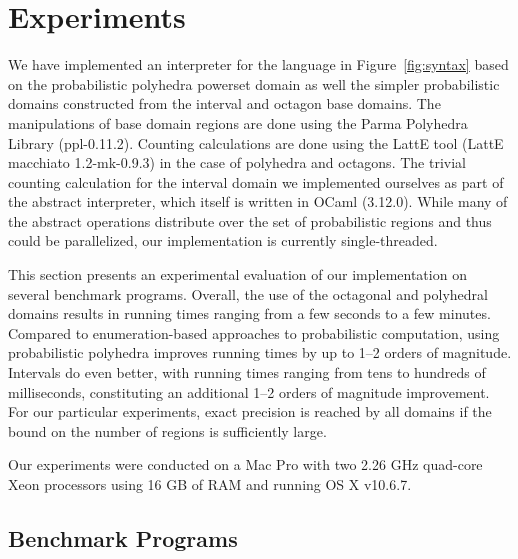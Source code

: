 \section{Experiments} \label{sec:impl}

We have implemented an interpreter for the language in
Figure~\ref{fig:syntax} based on the probabilistic polyhedra powerset
domain as well the simpler probabilistic domains constructed from the
interval and octagon base domains. The manipulations of base domain
regions are done using the Parma Polyhedra Library
\cite{parma} (ppl-0.11.2). Counting calculations are done using the LattE
\cite{latte} tool (LattE macchiato 1.2-mk-0.9.3) in the case of
polyhedra and octagons. The trivial counting
calculation for the interval domain we implemented ourselves as part
of the abstract interpreter, which itself is written in OCaml (3.12.0).  While
many of the abstract operations distribute over the set of
probabilistic regions and thus could be parallelized, our
implementation is currently single-threaded.


This section presents an experimental evaluation of
our implementation on several benchmark programs.  Overall, the
use of the octagonal and polyhedral domains results in running times
ranging from a few seconds to a few minutes. Compared to 
enumeration-based approaches to probabilistic computation, using
probabilistic polyhedra improves running times by up to 1--2 orders of
magnitude.  Intervals do even better, with running times ranging from
tens to hundreds of milliseconds, constituting an additional 1--2
orders of magnitude improvement.  For our particular experiments,
exact precision is reached by all 
domains if the bound on the number of regions is sufficiently large.

Our experiments
were conducted on a Mac Pro with two 2.26 GHz quad-core Xeon
processors using 16 GB of RAM and running OS X v10.6.7.  

\subsection{Benchmark Programs}
\label{sec:benchmarks}


